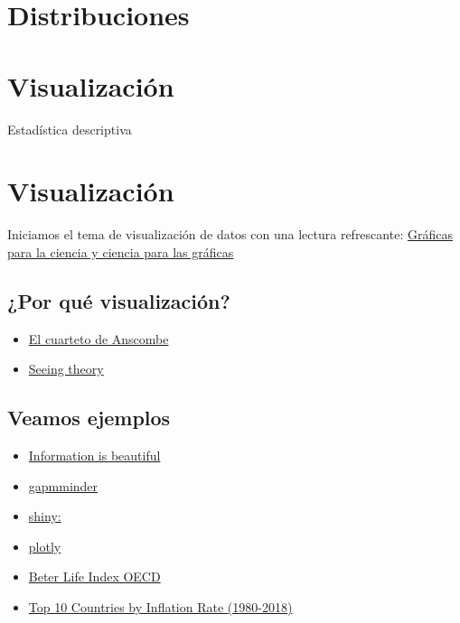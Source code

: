 \documentclass[
  letterpaper,
  DIV=11,
  numbers=noendperiod]{scrreprt}
\providecommand{\tightlist}{%
  \setlength{\itemsep}{0pt}\setlength{\parskip}{0pt}}\usepackage{longtable,booktabs,array}
\begin{document}
\chapter{Distribuciones}\label{distribuciones}

\chapter{Visualización}\label{visualizaciuxf3n}

Estadística descriptiva

\hfill\break

\chapter{Visualización}\label{visualizaciuxf3n-1}

Iniciamos el tema de visualización de datos con una lectura refrescante:
\href{https://culturacientifica.com/2019/04/25/graficas-para-la-ciencia-y-ciencia-para-las-graficas/}{Gráficas
para la ciencia y ciencia para las gráficas}

\section{¿Por qué visualización?}\label{por-quuxe9-visualizaciuxf3n}

\begin{itemize}
\tightlist
\item
  \href{https://en.wikipedia.org/wiki/Anscombe\%27s_quartet}{El cuarteto
  de Anscombe}
\item
  \href{https://seeing-theory.brown.edu}{Seeing theory}
\end{itemize}

\section{Veamos ejemplos}\label{veamos-ejemplos}

\begin{itemize}
\tightlist
\item
  \href{https://informationisbeautiful.net/}{Information is beautiful}
\item
  \href{https://www.gapminder.org/tools}{gapmminder}
\item
  \href{https://shiny.rstudio.com/gallery/}{shiny:}
\item
  \href{https://plot.ly/feed}{plotly}
\item
  \href{https://www.oecdbetterlifeindex.org/es/}{Beter Life Index OECD}
\item
  \href{https://www.youtube.com/watch?v=dwZ6B5kalbQ}{Top 10 Countries by
  Inflation Rate (1980-2018)}
\end{itemize}
\end{document}
